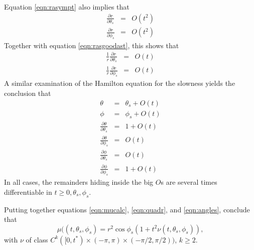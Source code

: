 Equation \ref{eqn:rasympt} also implies that
\begin{eqnarray}
\label{eqn:partr}
\frac{\partial r}{\partial \theta_s} & =& O(t^2)\nonumber \\
\frac{\partial r}{\partial \phi_s}    & =& O(t^2) 
\end{eqnarray}
Together with equation \ref{eqn:rasgoodast}, this shows that
\begin{eqnarray}
\label{eqn:quadr}
\frac{1}{r}\frac{\partial r}{\partial \theta_s} & =& O(t)\nonumber \\
\frac{1}{r}\frac{\partial r}{\partial \phi_s}    & =& O(t) 
\end{eqnarray}
A similar examination of the Hamilton equation for the slowness yields
the conclusion that
\begin{eqnarray}
\label{eqn:angles}
\theta &=& \theta_s + O(t) \nonumber\\
\phi    &=& \phi_s + O(t) \nonumber\\
\frac{\partial \theta}{\partial \theta_s} &=& 1 + O(t) \nonumber\\
\frac{\partial \theta}{\partial \phi_s} &=& O(t) \nonumber\\
\frac{\partial \phi}{\partial \theta_s} &=& O(t) \nonumber\\
\frac{\partial \phi}{\partial \phi_s} &=& 1 + O(t) 
\end{eqnarray}
In all cases, the remainders hiding inside the big $O$s are several 
times differentiable in $t \ge 0,\theta_s,\phi_s$. 

Putting together equations \ref{eqn:mucalc}, \ref{eqn:quadr}, and
\ref{eqn:angles}, conclude that
\begin{equation}
\label{eqn:muasympt}
\mu((t,\theta_s,\phi_s) = r^2 \cos \phi_s(1 +t^2\nu(t,\theta_s,\phi_s)), 
\end{equation}
with $\nu$ of class $C^k([0,t^*) \times (-\pi,\pi) \times
(-\pi/2,\pi/2))$, $k \ge 2$.

